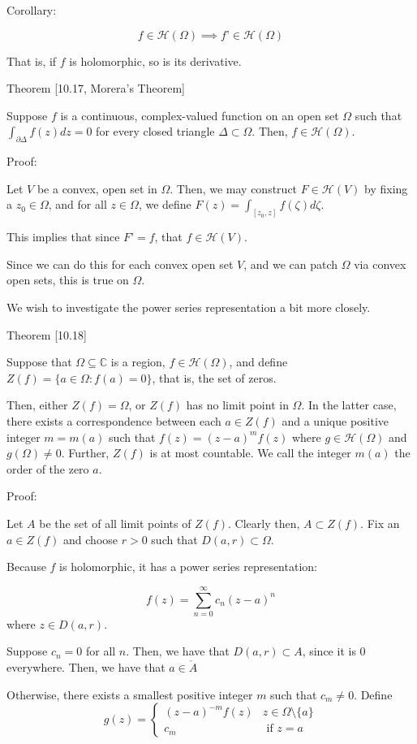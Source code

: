 \documentclass[10pt]{article}
\newcommand{\calH}{\mathcal{H}}
\begin{document}
Corollary:

$$f \in \calH(\Omega) \implies f’ \in \calH(\Omega)$$
 
 That is, if $f$ is holomorphic, so is its derivative.
 
Theorem [10.17, Morera’s Theorem]

Suppose $f$ is a continuous, complex-valued function on an open set $\Omega$ such that $\int_{\partial \Delta} f(z) dz = 0$ for every closed triangle $\Delta \subset \Omega$. Then, $f \in \calH(\Omega)$.

Proof:

Let $V$ be a convex, open set in $\Omega$. Then, we may construct $F \in \calH(V)$ by fixing a $z_0 \in \Omega$, and for all $z \in \Omega$, we define $F(z) = \int_{[z_0, z]} f(\zeta) d\zeta$.

This implies that since $F’ = f$, that $f \in \calH(V)$.

Since we can do this for each convex open set $V$, and we can patch $\Omega$ via convex open sets, this is true on $\Omega$.

We wish to investigate the power series representation a bit more closely.

Theorem [10.18]

Suppose that $\Omega \subseteq \mathbb{C}$ is a region, $f \in \calH(\Omega)$, and define $Z(f) = \{ a \in \Omega : f(a) = 0 \}$, that is, the set of zeros.

Then, either $Z(f) = \Omega$, or $Z(f)$ has no limit point in $\Omega$. In the latter case, there exists a correspondence between each $a \in Z(f)$ and a unique positive integer $m = m(a)$ such that $f(z) = (z-a)^m f(z)$ where $g \in \calH(\Omega)$ and $g(\Omega) \not = 0$. Further, $Z(f)$ is at most countable. We call the integer $m(a)$ the order of the zero $a$.

Proof:

Let $A$ be the set of all limit points of $Z(f)$. Clearly then, $A \subset Z(f)$. Fix an $a \in Z(f)$ and choose $r > 0$ such that $D(a,r) \subset \Omega$.

Because $f$ is holomorphic, it has a power series representation:

$$f(z) = \sum_{n=0}^\infty c_n (z-a)^n$$ where $z \in D(a,r)$. 

Suppose $c_n = 0$ for all $n$. Then, we have that $D(a,r) \subset A$, since it is 0 everywhere. Then, we have that $a \in \mathring{A}$

Otherwise, there exists a smallest positive integer $m$ such that $c_m \not = 0$. Define $$g(z) = \begin{cases} (z-a)^{-m} f(z) & z \in \Omega \setminus \{a\} \\ c_m & \text{ if } z = a \end{cases}$$
\end{document}
